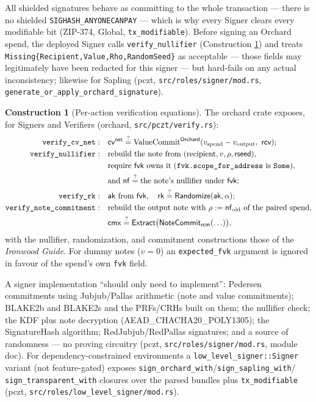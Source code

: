\documentclass[11pt,a4paper]{article}
\theoremstyle{definition}
\newtheorem{construction}[theorem]{Construction}
\newcommand{\nfsym}{\mathsf{nf}}
\newcommand{\cmx}{\mathsf{cmx}}
\newcommand{\cvsym}{\mathsf{cv}}
\newcommand{\rk}{\mathsf{rk}}
\newcommand{\NoteCommit}{\ensuremath{\mathsf{NoteCommit}}}
\newcommand{\Extract}{\ensuremath{\mathsf{Extract}}}
\newcommand{\aksym}{\ensuremath{\mathsf{ak}}}
\newcommand{\fvk}{\ensuremath{\mathsf{fvk}}}
\newcommand{\rcv}{\ensuremath{\mathsf{rcv}}}
\newcommand{\rcm}{\ensuremath{\mathsf{rcm}}}
\begin{document}
All shielded signatures behave as committing to the whole transaction ---
there is no shielded \texttt{SIGHASH\_ANYONECANPAY} --- which is why
every Signer clears every modifiable bit (ZIP-374, Global,
\texttt{tx\_modifiable}). Before signing an Orchard spend, the deployed
Signer calls \texttt{verify\_nullifier} (Construction
\ref{def:pczt-verify}) and treats
\texttt{Missing\{Recipient,Value,Rho,RandomSeed\}} as acceptable ---
those fields may legitimately have been redacted for this signer --- but
hard-fails on any actual inconsistency; likewise for Sapling
(\textsf{pczt}, \texttt{src/roles/signer/mod.rs},
\texttt{generate\_or\_apply\_orchard\_signature}).

\begin{construction}[Per-action verification equations]%
\label{def:pczt-verify}
The \textsf{orchard} crate exposes, for Signers and Verifiers
(\textsf{orchard}, \texttt{src/pczt/verify.rs}):
\begin{align*}
\texttt{verify\_cv\_net}: \quad &
\cvsym^{\mathsf{net}} \stackrel{?}{=}
\mathrm{ValueCommit}^{\mathsf{Orchard}}
(v_{\text{spend}} - v_{\text{output}},\ \rcv); \\
\texttt{verify\_nullifier}: \quad &
\text{rebuild the note from } (\text{recipient}, v, \rho,
\mathsf{rseed}), \\
& \text{require } \fvk \text{ owns it
(\texttt{fvk.scope\_for\_address} is \texttt{Some})}, \\
& \text{and }
\nfsym \stackrel{?}{=} \text{the note's nullifier under } \fvk; \\
\texttt{verify\_rk}: \quad &
\aksym \text{ from } \fvk, \quad
\rk \stackrel{?}{=} \mathsf{Randomize}(\aksym, \alpha); \\
\texttt{verify\_note\_commitment}: \quad &
\text{rebuild the output note with } \rho :=
\nfsym_{\mathrm{old}} \text{ of the paired spend}, \\
& \cmx \stackrel{?}{=} \Extract\bigl(\NoteCommit_{\rcm}(\ldots)\bigr),
\end{align*}
with the nullifier, randomization, and commitment constructions those of
the \emph{Ironwood Guide}. For dummy notes ($v = 0$) an
\texttt{expected\_fvk} argument is ignored in favour of the spend's own
\texttt{fvk} field.
\end{construction}

A signer implementation ``should only need to implement'': Pedersen
commitments using Jubjub/Pallas arithmetic (note and value commitments);
BLAKE2b and BLAKE2s and the PRFs/CRHs built on them; the nullifier check;
the KDF plus note decryption (AEAD\_CHACHA20\_POLY1305); the SignatureHash
algorithm; RedJubjub/RedPallas signatures; and a source of randomness ---
no proving circuitry (\textsf{pczt}, \texttt{src/roles/signer/mod.rs},
module doc). For dependency-constrained environments a
\texttt{low\_level\_signer::Signer} variant (not feature-gated) exposes
\texttt{sign\_orchard\_with}/\texttt{sign\_sapling\_with}/%
\texttt{sign\_transparent\_with} closures over the parsed bundles plus
\texttt{tx\_modifiable} (\textsf{pczt},
\texttt{src/roles/low\_level\_signer/mod.rs}).
\end{document}
